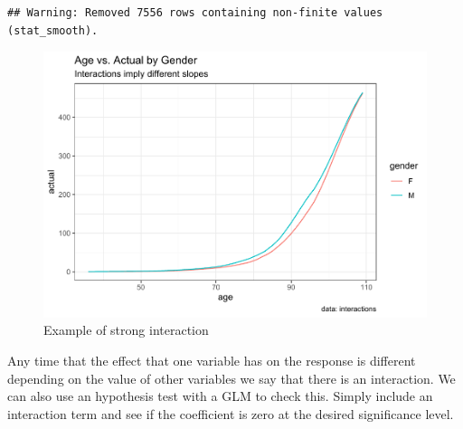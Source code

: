 \documentclass[]{book}
\newenvironment{Shaded}{\begin{snugshade}}{\end{snugshade}}
\newcommand{\DataTypeTok}[1]{\textcolor[rgb]{0.13,0.29,0.53}{#1}}
\newcommand{\FloatTok}[1]{\textcolor[rgb]{0.00,0.00,0.81}{#1}}
\newcommand{\KeywordTok}[1]{\textcolor[rgb]{0.13,0.29,0.53}{\textbf{#1}}}
\newcommand{\NormalTok}[1]{#1}
\newcommand{\OperatorTok}[1]{\textcolor[rgb]{0.81,0.36,0.00}{\textbf{#1}}}
\newcommand{\StringTok}[1]{\textcolor[rgb]{0.31,0.60,0.02}{#1}}
\begin{document}
\begin{Shaded}
\end{Shaded}

\begin{verbatim}
## Warning: Removed 7556 rows containing non-finite values (stat_smooth).
\end{verbatim}

\begin{figure}
\centering
\includegraphics{Exam-PA-Study-Manual_files/figure-latex/unnamed-chunk-98-1.pdf}
\caption{\label{fig:unnamed-chunk-98}Example of strong interaction}
\end{figure}

Any time that the effect that one variable has on the response is different depending on the value of other variables we say that there is an interaction. We can also use an hypothesis test with a GLM to check this. Simply include an interaction term and see if the coefficient is zero at the desired significance level.
\end{document}
